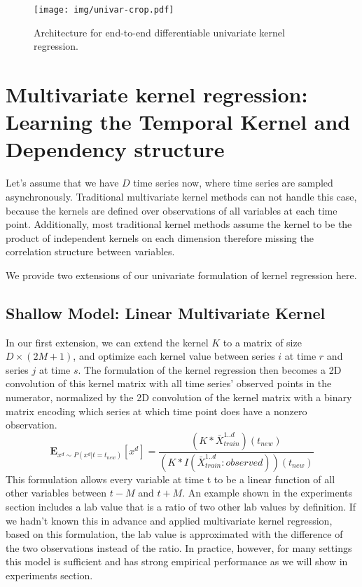 \documentclass{article} %
\begin{document}
\begin{figure}[h]
\begin{center}
\texttt{[image: img/univar-crop.pdf]}
\end{center}
\caption{Architecture for end-to-end differentiable univariate kernel regression.}\label{fig:arch}
\end{figure}

\section{Multivariate kernel regression: Learning the Temporal Kernel and Dependency structure}

Let's assume that we have $D$ time series now, where time series are sampled asynchronously. Traditional multivariate kernel methods can not handle this case, because the kernels are defined over observations of all variables at each time point. Additionally, most traditional kernel methods assume the kernel to be the product of independent kernels on each dimension therefore missing the correlation structure between variables.

We provide two extensions of our univariate formulation of kernel regression here. 

\subsection{Shallow Model: Linear Multivariate Kernel}
In our first extension, we can extend the kernel $K$ to a matrix of size $D \times (2M+1)$, and optimize each kernel value between series $i$ at time $r$ and series $j$ at time $s$. The formulation of the kernel regression then becomes a 2D convolution of this kernel matrix with all time series' observed points in the numerator, normalized by the 2D convolution of the kernel matrix with a binary matrix encoding which series at which time point does have a nonzero observation. 
% 
$$ \mathbf{E}_{x^d \sim P(x^d|t=t_{new})}[x^d] = \frac{(K \ast \bar X^{1..d}_{train})(t_{new})}{(K \ast I(\bar X^{1..d}_{train} :observed)) (t_{new})} $$
% 
This formulation allows every variable at time t to be a linear function of all other variables between $t-M$ and $t+M$. An example shown in the experiments section includes a lab value that is a ratio of two other lab values by definition. If we hadn't known this in advance and applied multivariate kernel regression, based on this formulation, the lab value is approximated with the difference of the two observations instead of the ratio. In practice, however, for many settings this model is sufficient and has strong empirical performance as we will show in experiments section.
\end{document}
